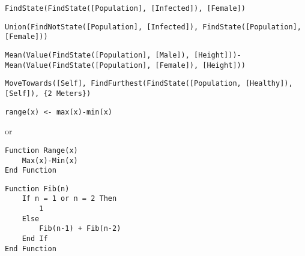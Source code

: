 \documentclass[]{memoir}
\begin{document}
\lstinline!FindState(FindState([Population], [Infected]), [Female])!


\lstinline!Union(FindNotState([Population], [Infected]), FindState([Population], [Female]))!


\lstinline!Mean(Value(FindState([Population], [Male]), [Height]))-Mean(Value(FindState([Population], [Female]), [Height]))!


\lstinline!MoveTowards([Self], FindFurthest(FindState([Population, [Healthy]), [Self]), {2 Meters})!


\lstinline!range(x) <- max(x)-min(x)!

or

\begin{lstlisting}
Function Range(x)
    Max(x)-Min(x)
End Function
\end{lstlisting}


\begin{lstlisting}
Function Fib(n)
    If n = 1 or n = 2 Then
        1
    Else
        Fib(n-1) + Fib(n-2)
    End If
End Function
\end{lstlisting}
\end{document}

